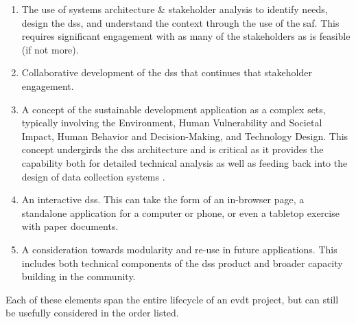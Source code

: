\begin{enumerate}
	\item{The use of systems architecture \& stakeholder analysis to identify needs, design the \ac{dss}, and understand the context through the use of the \ac{saf}. This requires significant engagement with as many of the stakeholders as is feasible (if not more).}
	\item{Collaborative development of the \ac{dss} that continues that stakeholder engagement.}
	\item{A concept of the sustainable development application as a complex \ac{sets}, typically involving the Environment, Human Vulnerability and Societal Impact, Human Behavior and Decision-Making, and Technology Design. This concept undergirds the \ac{dss} architecture and is critical as it provides the capability both for detailed technical analysis as well as feeding back into the design of data collection systems . \label{item:evdt}}
	\item{An interactive \ac{dss}. This can take the form of an in-browser page, a standalone application for a computer or phone, or even a tabletop exercise with paper documents.}
	\item{A consideration towards modularity and re-use in future applications. This includes both technical components of the \ac{dss} product and broader capacity building in the community.}
\end{enumerate}

Each of these elements span the entire lifecycle of an \ac{evdt} project, but can still be usefully considered in the order listed.

\subsection{} \label{sec:saf}

